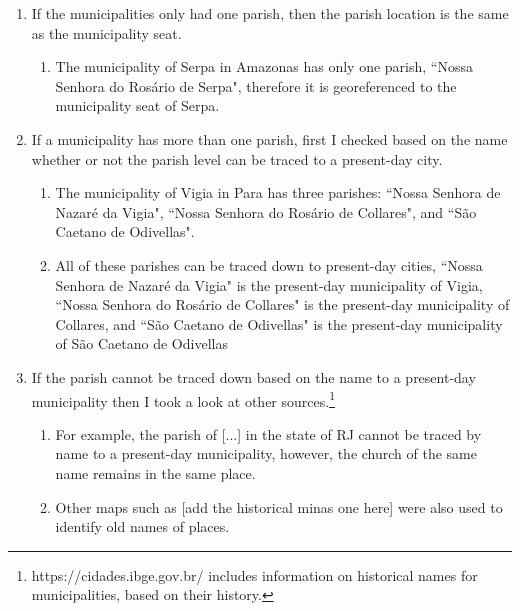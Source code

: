 \documentclass{article}
\begin{document}
\begin{enumerate}
  \item If the municipalities only had one parish, then the parish location is the same as the municipality seat.
  \begin{enumerate}
    \item The municipality of Serpa in Amazonas has only one parish, ``Nossa Senhora do Rosário de Serpa", therefore it is georeferenced to the municipality seat of Serpa.
  \end{enumerate}
  \item If a municipality has more than one parish, first I checked based on the name whether or not the parish level can be traced to a present-day city.
  \begin{enumerate}
    \item The municipality of Vigia in Para has three parishes: ``Nossa Senhora de Nazaré da Vigia", ``Nossa Senhora do Rosário de Collares", and ``São Caetano de Odivellas". 
    \item All of these parishes can be traced down to present-day cities, ``Nossa Senhora de Nazaré da Vigia" is the present-day municipality of Vigia, ``Nossa Senhora do Rosário de Collares" is the present-day municipality of Collares, and ``São Caetano de Odivellas" is the present-day municipality of São Caetano de Odivellas
  \end{enumerate}
  \item If the parish cannot be traced down based on the name to a present-day municipality then I took a look at other sources.\footnote{https://cidades.ibge.gov.br/ includes information on historical names for municipalities, based on their history.}
    \begin{enumerate}
      \item For example, the parish of [...] in the state of RJ cannot be traced by name to a present-day municipality, however, the church of the same name remains in the same place.
      \item Other maps such as [add the historical minas one here] were also used to identify old names of places.
    \end{enumerate}
\end{enumerate}

\clearpage

\end{document}
